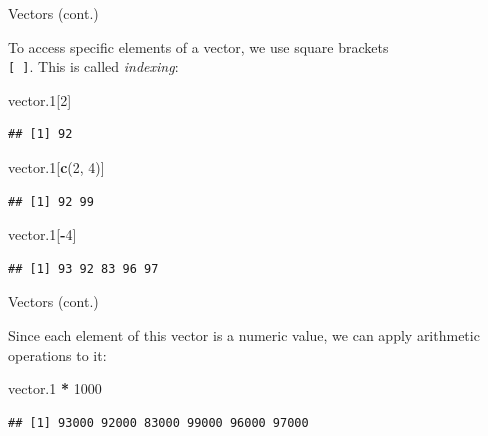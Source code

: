 \documentclass[ignorenonframetext,]{beamer}
\newenvironment{Shaded}{\begin{snugshade}}{\end{snugshade}}
\newcommand{\KeywordTok}[1]{\textcolor[rgb]{0.13,0.29,0.53}{\textbf{#1}}}
\newcommand{\DecValTok}[1]{\textcolor[rgb]{0.00,0.00,0.81}{#1}}
\newcommand{\StringTok}[1]{\textcolor[rgb]{0.31,0.60,0.02}{#1}}
\newcommand{\OperatorTok}[1]{\textcolor[rgb]{0.81,0.36,0.00}{\textbf{#1}}}
\newcommand{\NormalTok}[1]{#1}
\begin{document}
\begin{frame}[fragile]{Vectors (cont.)}

To access specific elements of a vector, we use square brackets\\
\texttt{{[}\ {]}}. This is called \emph{indexing}:

\begin{Shaded}
\begin{Highlighting}[]
\NormalTok{vector.}\DecValTok{1}\NormalTok{[}\DecValTok{2}\NormalTok{]}
\end{Highlighting}
\end{Shaded}

\begin{verbatim}
## [1] 92
\end{verbatim}

\begin{Shaded}
\begin{Highlighting}[]
\NormalTok{vector.}\DecValTok{1}\NormalTok{[}\KeywordTok{c}\NormalTok{(}\DecValTok{2}\NormalTok{, }\DecValTok{4}\NormalTok{)]}
\end{Highlighting}
\end{Shaded}

\begin{verbatim}
## [1] 92 99
\end{verbatim}

\begin{Shaded}
\begin{Highlighting}[]
\NormalTok{vector.}\DecValTok{1}\NormalTok{[}\OperatorTok{-}\DecValTok{4}\NormalTok{]}
\end{Highlighting}
\end{Shaded}

\begin{verbatim}
## [1] 93 92 83 96 97
\end{verbatim}

\end{frame}

\begin{frame}[fragile]{Vectors (cont.)}

Since each element of this vector is a numeric value, we can apply
arithmetic operations to it:

\begin{Shaded}
\begin{Highlighting}[]
\NormalTok{vector.}\DecValTok{1} \OperatorTok{*}\StringTok{ }\DecValTok{1000}
\end{Highlighting}
\end{Shaded}

\begin{verbatim}
## [1] 93000 92000 83000 99000 96000 97000
\end{verbatim}

\end{frame}
\end{document}
